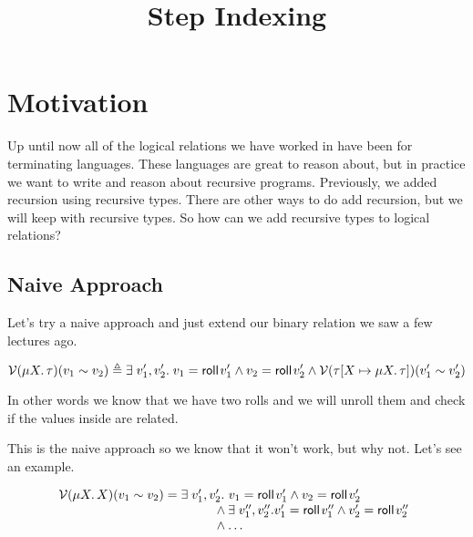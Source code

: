 \documentclass{lecturenotes}
\title{Step Indexing}
\newcommand{\spa}{\mkern5mu}
\newcommand{\val}[3]{\ensuremath{\mathcal{V}(#1)(#2 \sim #3)}}
\newcommand{\rectype}[2]{\ensuremath{\mu #1.\,#2}}
\newcommand{\roll}[1]{\textsf{roll}\mkern2mu#1}
\begin{document}
\raggedright
\maketitle

\section{Motivation}

Up until now all of the logical relations we have worked in have been for terminating languages. 
  These languages are great to reason about, but in practice we want to write and reason about recursive programs. 
  Previously, we added recursion using recursive types. 
  There are other ways to do add recursion, but we will keep with recursive types.
  So how can we add recursive types to logical relations? 

\subsection{Naive Approach}
Let's try a naive approach and just extend our binary relation we saw a few lectures ago. 

  $$\val{\rectype{X}{\tau}}{v_1}{v_2} \triangleq 
    \exists \spa v_1', v_2'. \spa
    v_1 = \roll{v_1'} \wedge 
    v_2 = \roll{v_2'} \wedge
    \val{\tau[X \mapsto \rectype{X}{\tau}]}{v_1'}{v_2'}$$

  In other words we know that we have two rolls and we will unroll them and check if the values inside are related.  

This is the naive approach so we know that it won't work, but why not. 
  Let's see an example. 


$$\begin{array}{r@{=}l} \val{\rectype{X}{X}}{v_1}{v_2} \spa & \spa \exists \spa v_1', v_2'.\,\hspace{-1.5em}
  \begin{array}[t]{l} \hspace{1.15em} 
    v_1 = \roll{v_1'} \wedge v_2 = \roll{v_2'}\\
    {} \land \exists \spa v_1'', v_2''. v_1' = \roll{v_1''} \wedge v_2' = \roll{v_2''} \\
    {} \land \dots 
  \end{array}\\
\end{array}$$
\end{document}
